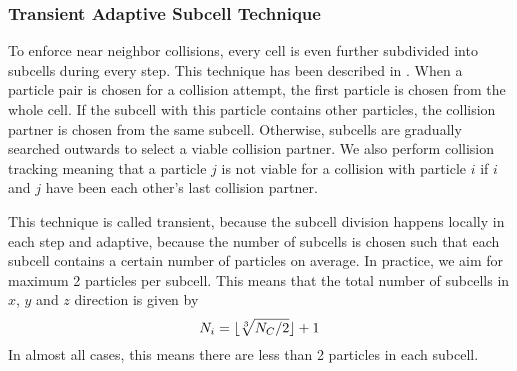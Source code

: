 \subsubsection*{Transient Adaptive Subcell Technique}
To enforce near neighbor collisions, every cell is even further subdivided into subcells during every step. This technique has been described in \cite{SU20101136}. When a particle pair is chosen for a collision attempt, the first particle is chosen from the whole cell. If the subcell with this particle contains other particles, the collision partner is chosen from the same subcell. Otherwise, subcells are gradually searched outwards to select a viable collision partner. We also perform collision tracking meaning that a particle $j$ is not viable for a collision with particle $i$ if $i$ and $j$ have been each other's last collision partner.

This technique is called transient, because the subcell division happens locally in each step and adaptive, because the number of subcells is chosen such that each subcell contains a certain number of particles on average. In practice, we aim for maximum 2 particles per subcell. This means that the total number of subcells in $x$, $y$ and $z$ direction is given by
\begin{equation} \label{eq:tas_ncells}
    N_i = \lfloor\sqrt[3]{N_C / 2}\rfloor + 1
\end{equation}
In almost all cases, this means there are less than 2 particles in each subcell.

